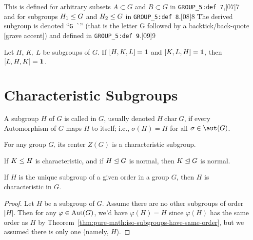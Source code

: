 \begin{def-remark}
This is defined for arbitrary subsets $A\subset G$ and $B\subset G$ in
\verb#GROUP_5:def 7#,[07]{7} and for subgroups $H_{1}\leq G$ and
$H_{2}\leq G$ in \verb#GROUP_5:def 8#.[08]{8} The derived subgroup is
denoted ``\verb#G `#'' (that is the letter G followed by a
backtick/back-quote [grave accent]) and defined in \verb#GROUP_5:def 9#.[09]{9}
\end{def-remark}


\begin{theorem}
  Let $H$, $K$, $L$ be subgroups of $G$.
  If $[H,K,L]=\mathbf{1}$ and $[K,L,H]=\mathbf{1}$,
  then $[L,H,K]=\mathbf{1}$.
\end{theorem}

\section{Characteristic Subgroups}

\begin{definition}
A subgroup $H$ of $G$ is called  in $G$, usually
denoted $H~\mathrm{char}~G$, if every Automorphism of $G$ maps $H$ to
itself; i.e., $\sigma(H)=H$ for all $\sigma\in\aut(G)$.
\end{definition}

\begin{theorem}
For any group $G$, its center $Z(G)$ is a characteristic subgroup.
\end{theorem}

\begin{theorem}
If $K\leq H$ is characteristic, and if $H\trianglelefteq G$ is normal,
then $K\trianglelefteq G$ is normal.
\end{theorem}

\begin{theorem}
  If $H$ is the unique subgroup of a given order in a group $G$,
  then $H$ is characteristic in $G$.
\end{theorem}

\begin{proof}
Let $H$ be a subgroup of $G$. Assume there are no other subgroups of
order $|H|$. Then for any $\varphi\in\operatorname{Aut}(G)$, we'd have $\varphi(H)=H$
since $\varphi(H)$ has the same order as $H$ by
Theorem~\ref{thm:pure-math:iso-subgroups-have-same-order}, but we
assumed there is only one (namely, $H$).
\end{proof}

